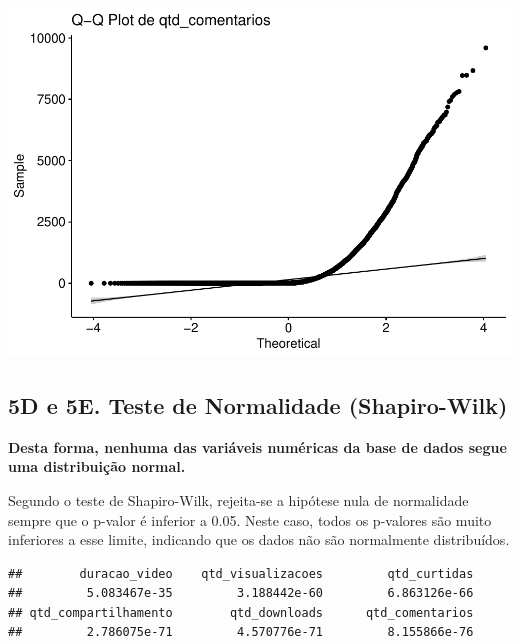 \documentclass[
]{article}
\newenvironment{Shaded}{\begin{snugshade}}{\end{snugshade}}
\newcommand{\ControlFlowTok}[1]{\textcolor[rgb]{0.13,0.29,0.53}{\textbf{#1}}}
\newcommand{\FunctionTok}[1]{\textcolor[rgb]{0.13,0.29,0.53}{\textbf{#1}}}
\newcommand{\NormalTok}[1]{#1}
\newcommand{\OtherTok}[1]{\textcolor[rgb]{0.56,0.35,0.01}{#1}}
\newcommand{\SpecialCharTok}[1]{\textcolor[rgb]{0.81,0.36,0.00}{\textbf{#1}}}
\begin{document}
\includegraphics{dados_videos_files/figure-latex/qqplot_variaveis-6.pdf}

\subsection{5D e 5E. Teste de Normalidade
(Shapiro-Wilk)}\label{d-e-5e.-teste-de-normalidade-shapiro-wilk}

\textbf{Desta forma, nenhuma das variáveis numéricas da base de dados
segue uma distribuição normal.}

Segundo o teste de Shapiro-Wilk, rejeita-se a hipótese nula de
normalidade sempre que o p-valor é inferior a 0.05. Neste caso, todos os
p-valores são muito inferiores a esse limite, indicando que os dados não
são normalmente distribuídos.

\begin{Shaded}
\end{Shaded}

\begin{verbatim}
##        duracao_video    qtd_visualizacoes         qtd_curtidas 
##         5.083467e-35         3.188442e-60         6.863126e-66 
## qtd_compartilhamento        qtd_downloads      qtd_comentarios 
##         2.786075e-71         4.570776e-71         8.155866e-76
\end{verbatim}
\end{document}
